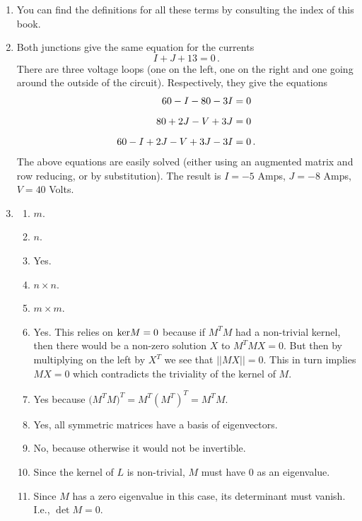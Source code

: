 \begin{enumerate}
\item You can find the definitions for all these terms by consulting the index of this book.

\item Both junctions give the same equation for the currents
\[
I+J+13=0\, .
\]
There are three voltage loops (one on the left, one on the right and one going around the outside of the circuit). Respectively, they give the equations
\begin{align}
60-I-80-3I=0&\nonumber\\[2mm]
80+2J-V+3J=0&\nonumber\\[2mm]
60-I+2J-V+3J-3I=0&\, .
\end{align}
The above equations are easily solved (either using an augmented matrix and row reducing, or by substitution). The result is $I=-5$ Amps, $J=-8$ Amps, $V=40$ Volts.



\item 
\begin{enumerate}
\item $m$.
\item $n$.
\item Yes.
\item $n\times n$.
\item $m\times m$.
\item Yes. This relies on ${\rm ker} M=0$ because if $M^T M$ had a non-trivial kernel, then there would be a non-zero solution $X$ to $M^T M X=0$. But then by multiplying on the left by $X^T$ we see that $||MX||=0$. This in turn implies $MX=0$ which contradicts the triviality of the kernel of $M$. 
\item Yes because $\big(M^T M\big)^T=M^T (M^T)^T=M^T M$.
\item Yes, all symmetric matrices have a basis of eigenvectors.
\item No, because otherwise it would not be invertible.
\item Since the kernel of $L$ is non-trivial, $M$ must have $0$ as an eigenvalue.
\item Since $M$ has a zero eigenvalue in this case, its determinant must vanish. {I.e.}, $\det M=0$.
\end{enumerate}


\end{enumerate}
